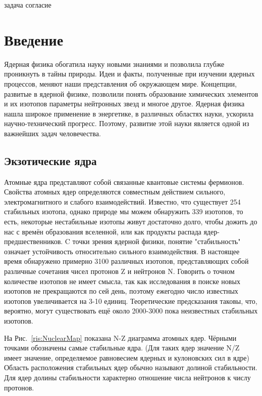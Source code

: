 \newpage задача
\newpage согласие
\newpage
\tableofcontents
\newpage
\section{Введение}

Ядерная физика обогатила науку новыми знаниями и позволила глубже проникнуть в тайны природы. Идеи и факты, полученные при изучении ядерных процессов, меняют наши представления об окружающем мире. Концепции, развитые в ядерной физике, позволили понять образование химических элементов и их изотопов параметры нейтронных звезд и многое другое. Ядерная физика нашла широкое применение в энергетике, в различных областях науки, ускорила научно-технический прогресс. Поэтому, развитие этой науки является одной из важнейших задач человечества.

\subsection{Экзотические ядра}

Атомные ядра представляют собой связанные квантовые системы фермионов. Свойства атомных ядер определяются совместным действием сильного, электромагнитного и слабого взаимодействий. Известно, что существует 254 стабильных изотопа, однако природе мы можем обнаружить 339 изотопов\cite{ufn}, то есть, некоторые нестабильные изотопы живут достаточно долго, чтобы дожить до нас с времён образования вселенной, или как продукты распада ядер-предшественников. C точки зрения ядерной физики, понятие "стабильность" означает устойчивость относительно сильного взаимодействия. В настоящее время обнаружено примерно 3100 различных изотопов\cite{ufn}, представляющих собой различные сочетания чисел протонов Z и нейтронов N. Говорить о точном количестве изотопов не имеет смысла, так как исследования в поиске новых изотопов не прекращаются по сей день, поэтому ежегодно число известных изотопов увеличивается на 3-10 единиц. Теоретические предсказания таковы, что, вероятно, могут существовать ещё около 2000-3000 пока неизвестных стабильных изотопов\cite{ufn}. 

На Рис.~\ref{ris:NuclearMap} показана N-Z диаграмма атомных ядер. Чёрными точками обозначены самые стабильные ядра. (Для таких ядер  значение N/Z имеет значение, определяемое равновесием ядерных и кулоновских сил в ядре) Область расположения стабильных ядер обычно называют долиной стабильности. Для ядер долины стабильности характерно отношение числа нейтронов к числу протонов.

